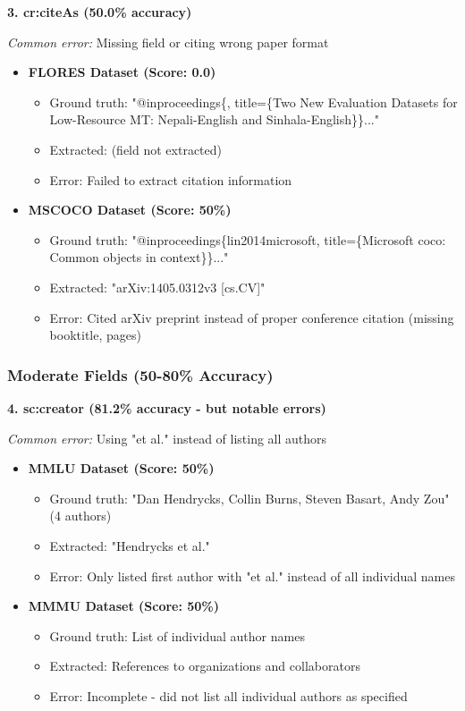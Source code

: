 \documentclass[11pt,a4paper]{article}
\begin{document}
\textbf{3. cr:citeAs (50.0\% accuracy)}

\textit{Common error:} Missing field or citing wrong paper format

\begin{itemize}[leftmargin=*]
    \item \textbf{FLORES Dataset (Score: 0.0)}
    \begin{itemize}
        \item Ground truth: "@inproceedings\{, title=\{Two New Evaluation Datasets for Low-Resource MT: Nepali-English and Sinhala-English\}\}..."
        \item Extracted: (field not extracted)
        \item Error: Failed to extract citation information
    \end{itemize}

    \item \textbf{MSCOCO Dataset (Score: 50\%)}
    \begin{itemize}
        \item Ground truth: "@inproceedings\{lin2014microsoft, title=\{Microsoft coco: Common objects in context\}\}..."
        \item Extracted: "arXiv:1405.0312v3 [cs.CV]"
        \item Error: Cited arXiv preprint instead of proper conference citation (missing booktitle, pages)
    \end{itemize}
\end{itemize}

\subsubsection{Moderate Fields (50-80\% Accuracy)}

\textbf{4. sc:creator (81.2\% accuracy - but notable errors)}

\textit{Common error:} Using "et al." instead of listing all authors

\begin{itemize}[leftmargin=*]
    \item \textbf{MMLU Dataset (Score: 50\%)}
    \begin{itemize}
        \item Ground truth: "Dan Hendrycks, Collin Burns, Steven Basart, Andy Zou" (4 authors)
        \item Extracted: "Hendrycks et al."
        \item Error: Only listed first author with "et al." instead of all individual names
    \end{itemize}

    \item \textbf{MMMU Dataset (Score: 50\%)}
    \begin{itemize}
        \item Ground truth: List of individual author names
        \item Extracted: References to organizations and collaborators
        \item Error: Incomplete - did not list all individual authors as specified
    \end{itemize}
\end{itemize}
\end{document}
